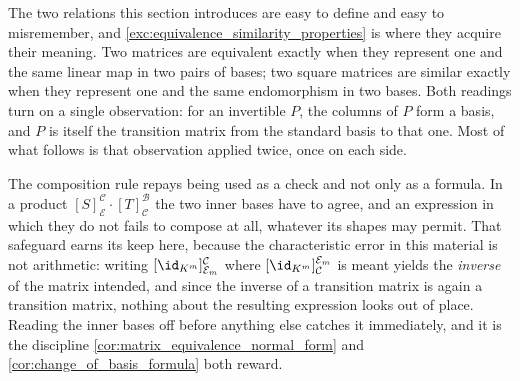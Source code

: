 \begin{ainote}
The two relations this section introduces are easy to define and easy to
misremember, and \cref{exc:equivalence_similarity_properties} is where they
acquire their meaning. Two matrices are equivalent exactly when they represent
one and the same linear map in two pairs of bases; two square matrices are
similar exactly when they represent one and the same endomorphism in two bases.
Both readings turn on a single observation: for an invertible $P$, the columns
of $P$ form a basis, and $P$ is itself the transition matrix from the standard
basis to that one. Most of what follows is that observation applied twice, once
on each side.

The composition rule repays being used as a check and not only as a formula. In
a product $[S]_{\mathcal{E}}^{\mathcal{C}} \cdot [T]_{\mathcal{C}}^{\mathcal{B}}$
the two inner bases have to agree, and an expression in which they do not fails
to compose at all, whatever its shapes may permit. That safeguard earns its keep
here, because the characteristic error in this material is not arithmetic:
writing $[\id_{K^m}]_{\mathcal{E}_m}^{\mathcal{C}}$ where
$[\id_{K^m}]_{\mathcal{C}}^{\mathcal{E}_m}$ is meant yields the \emph{inverse}
of the matrix intended, and since the inverse of a transition matrix is again a
transition matrix, nothing about the resulting expression looks out of place.
Reading the inner bases off before anything else catches it immediately, and it
is the discipline \cref{cor:matrix_equivalence_normal_form} and
\cref{cor:change_of_basis_formula} both reward.
\end{ainote}
